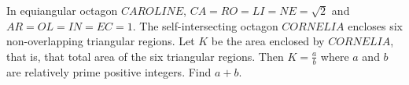 In equiangular octagon $CAROLINE$,  $CA = RO = LI = NE = \sqrt{2}$ and $AR = OL = IN = EC = 1$. The self-intersecting octagon $CORNELIA$ encloses six non-overlapping triangular regions. Let $K$ be the area enclosed by $CORNELIA$,  that is, that total area of the six triangular regions. Then $K=\tfrac{a}{b}$ where $a$ and $b$ are relatively prime positive integers. Find $a + b$.